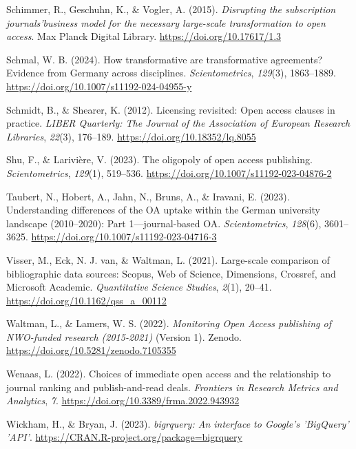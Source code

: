 \documentclass[a4paper,man,floatsintext,longtable,noextraspace,12pt]{apa6}
\newlength{\cslhangindent}
\newenvironment{CSLReferences}[2] %
  {\begin{list}{}{%
   \setlength{\itemindent}{0pt}
   \setlength{\leftmargin}{0pt}
   \setlength{\parsep}{0pt}
   \ifodd #1
    \setlength{\leftmargin}{\cslhangindent}
    \setlength{\itemindent}{-1\cslhangindent}
   \fi
   \setlength{\itemsep}{#2\baselineskip}}}
  {\end{list}}
\begin{document}
\begin{CSLReferences}{1}{0}
Schimmer, R., Geschuhn, K., \& Vogler, A. (2015). \emph{{Disrupting the
subscription journals'business model for the necessary large-scale
transformation to open access}}. Max Planck Digital Library.
\url{https://doi.org/10.17617/1.3}

Schmal, W. B. (2024). How transformative are transformative agreements?
Evidence from {Germany} across disciplines. \emph{Scientometrics},
\emph{129}(3), 1863--1889.
\url{https://doi.org/10.1007/s11192-024-04955-y}

Schmidt, B., \& Shearer, K. (2012). Licensing revisited: Open access
clauses in practice. \emph{LIBER Quarterly: The Journal of the
Association of European Research Libraries}, \emph{22}(3), 176--189.
\url{https://doi.org/10.18352/lq.8055}

Shu, F., \& Larivière, V. (2023). The oligopoly of open access
publishing. \emph{Scientometrics}, \emph{129}(1), 519--536.
\url{https://doi.org/10.1007/s11192-023-04876-2}

Taubert, N., Hobert, A., Jahn, N., Bruns, A., \& Iravani, E. (2023).
Understanding differences of the OA uptake within the {German}
university landscape (2010--2020): Part 1---journal-based OA.
\emph{Scientometrics}, \emph{128}(6), 3601--3625.
\url{https://doi.org/10.1007/s11192-023-04716-3}

Visser, M., Eck, N. J. van, \& Waltman, L. (2021). Large-scale
comparison of bibliographic data sources: {Scopus, Web of Science,
Dimensions, Crossref, and Microsoft Academic}. \emph{Quantitative
Science Studies}, \emph{2}(1), 20--41.
\url{https://doi.org/10.1162/qss_a_00112}

Waltman, L., \& Lamers, W. S. (2022). \emph{{Monitoring Open Access
publishing of NWO-funded research (2015-2021)}} (Version 1). Zenodo.
\url{https://doi.org/10.5281/zenodo.7105355}

Wenaas, L. (2022). Choices of immediate open access and the relationship
to journal ranking and publish-and-read deals. \emph{Frontiers in
Research Metrics and Analytics}, \emph{7}.
\url{https://doi.org/10.3389/frma.2022.943932}

Wickham, H., \& Bryan, J. (2023). \emph{{bigrquery: An interface to
Google's 'BigQuery' 'API'}}.
\url{https://CRAN.R-project.org/package=bigrquery}


\end{CSLReferences}
\end{document}
